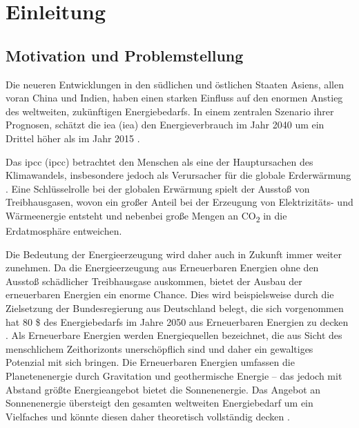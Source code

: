 \renewcommand{\chapterheadstartvskip}{\vspace*{2cm}}

\chapter{Einleitung}
\label{chap:einleitung}
\setcounter{page}{1}
\renewcommand{\chapterheadstartvskip}{\vspace*{-1cm}}


\section{Motivation und Problemstellung}
\label{sec:motivation}

Die neueren Entwicklungen in den südlichen und östlichen Staaten Asiens, allen voran China und Indien, haben einen starken Einfluss auf den enormen Anstieg des weltweiten, zukünftigen Energiebedarfs. In einem zentralen Szenario ihrer Prognosen, schätzt die \acrlong{iea} (\acrshort{iea}) den Energieverbrauch im Jahr 2040 um ein Drittel höher als im Jahr 2015 \cite[S.~1]{in15}.

Das \acrlong{ipcc} (\acrshort{ipcc}) betrachtet den Menschen als eine der Hauptursachen des Klimawandels, insbesondere jedoch als Verursacher für die globale Erderwärmung \cite[S.~V]{ip14}. Eine Schlüsselrolle bei der globalen Erwärmung spielt der Ausstoß von Treibhausgasen, wovon ein großer Anteil bei der Erzeugung von Elektrizitäts- und Wärmeenergie entsteht und nebenbei große Mengen an CO\textsubscript{2} in die Erdatmosphäre entweichen\cite[S.~47]{ip14}.

Die Bedeutung der Energieerzeugung wird daher auch in Zukunft immer weiter zunehmen. Da die Energieerzeugung aus Erneuerbaren Energien ohne den Ausstoß schädlicher Treibhausgase auskommen, bietet der Ausbau der erneuerbaren Energien  ein enorme Chance. Dies wird beispielsweise durch die Zielsetzung der Bundesregierung aus Deutschland belegt, die sich vorgenommen hat 80 \$ des Energiebedarfs im Jahre 2050 aus Erneuerbaren Energien zu decken \cite[S.~2]{bi15}.
Als Erneuerbare Energien werden Energiequellen bezeichnet, die aus Sicht des menschlichem Zeithorizonts unerschöpflich sind und daher ein gewaltiges Potenzial mit sich bringen. Die Erneuerbaren Energien umfassen die Planetenenergie durch Gravitation und geothermische Energie -- das jedoch mit Abstand größte Energieangebot bietet die Sonnenenergie. Das Angebot an Sonnenenergie übersteigt den gesamten weltweiten Energiebedarf um ein Vielfaches und könnte diesen daher theoretisch vollständig decken \cite[S.~34f.]{qu11}.

